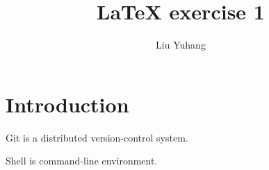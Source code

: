 \documentclass{article}
\title{LaTeX exercise 1}
\author{Liu Yuhang}
\date{}
\begin{document}
\maketitle

\section{Introduction}
Git is a distributed version-control system.

Shell is command-line environment.
\end{document}
